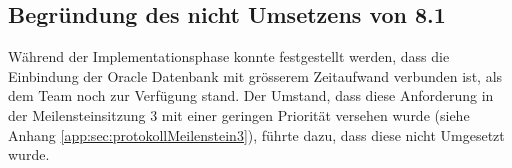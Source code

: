 \subsection{Begründung des nicht Umsetzens von 8.1}
Während der Implementationsphase konnte festgestellt werden, dass die Einbindung der Oracle Datenbank mit grösserem Zeitaufwand verbunden ist, als dem Team noch zur Verfügung stand. Der Umstand, dass diese Anforderung in der Meilensteinsitzung 3 mit einer geringen Priorität versehen wurde (siehe Anhang \ref{app:sec:protokollMeilenstein3}), führte dazu, dass diese nicht Umgesetzt wurde.
